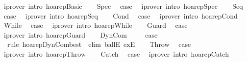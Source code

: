 \begin{isabellebody}
\ {\isacharparenleft}iprover\ intro{\isacharcolon}\ hoarep{\isachardot}Basic{\isacharparenright}\isanewline
{}\isamarkupfalse%
\isanewline
\ \ \isamarkupfalse%
\ Spec\ \isamarkupfalse%
\ {\isacharquery}case\ \isamarkupfalse%
\ {\isacharparenleft}iprover\ intro{\isacharcolon}\ hoarep{\isachardot}Spec{\isacharparenright}\isanewline
{}\isamarkupfalse%
\isanewline
\ \ \isamarkupfalse%
\ Seq\ \isamarkupfalse%
\ {\isacharquery}case\ \isamarkupfalse%
\ {\isacharparenleft}iprover\ intro{\isacharcolon}\ hoarep{\isachardot}Seq{\isacharparenright}\isanewline
{}\isamarkupfalse%
\isanewline
\ \ \isamarkupfalse%
\ Cond\ \isamarkupfalse%
\ {\isacharquery}case\ \isamarkupfalse%
\ {\isacharparenleft}iprover\ intro{\isacharcolon}\ hoarep{\isachardot}Cond{\isacharparenright}\isanewline
{}\isamarkupfalse%
\isanewline
\ \ \isamarkupfalse%
\ While\ \isamarkupfalse%
\ {\isacharquery}case\ \isamarkupfalse%
\ {\isacharparenleft}iprover\ intro{\isacharcolon}\ hoarep{\isachardot}While{\isacharparenright}\isanewline
{}\isamarkupfalse%
\isanewline
\ \ \isamarkupfalse%
\ Guard\ \isamarkupfalse%
\ {\isacharquery}case\ \isamarkupfalse%
\ {\isacharparenleft}iprover\ intro{\isacharcolon}\ hoarep{\isachardot}Guard{\isacharparenright}\isanewline
\isanewline
{}\isamarkupfalse%
\isanewline
\ \ \isamarkupfalse%
\ DynCom\ \isanewline
\ \ \isamarkupfalse%
\ {\isacharquery}case\isanewline
\ \ \ \ \isamarkupfalse%
\ {\isacharminus}\ {\isacharparenleft}rule\ hoarep{\isachardot}DynCom{\isacharcomma}best\ \ elim{\isacharbang}{\isacharcolon}\ ballE\ exE{\isacharparenright}\isanewline
{}\isamarkupfalse%
\isanewline
\ \ \isamarkupfalse%
\ Throw\ \isamarkupfalse%
\ {\isacharquery}case\ \isamarkupfalse%
\ {\isacharparenleft}iprover\ intro{\isacharcolon}\ hoarep{\isachardot}Throw{\isacharparenright}\isanewline
{}\isamarkupfalse%
\isanewline
\ \ \isamarkupfalse%
\ Catch\ \isamarkupfalse%
\ {\isacharquery}case\ \isamarkupfalse%
\ {\isacharparenleft}iprover\ intro{\isacharcolon}\ hoarep{\isachardot}Catch{\isacharparenright}\isanewline
\isanewline
{}\isamarkupfalse%
\isanewline
\ \ \isamarkupfalse%

\end{isabellebody}
